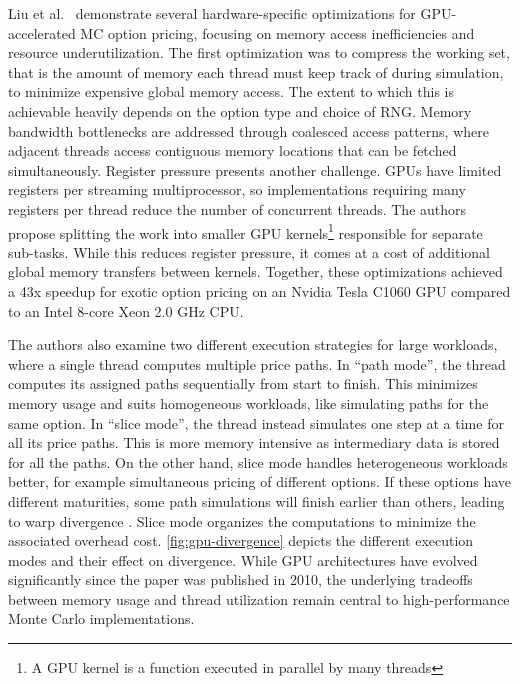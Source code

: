 \documentclass[english,12pt,a4paper,pdftex,sci,utf8]{aaltothesis}
\begin{document}
Liu et al.\ \cite{liu2010efficient} demonstrate several hardware-specific optimizations for GPU-accelerated MC option pricing, focusing on memory access inefficiencies and resource underutilization. The first optimization was to compress the working set, that is the amount of memory each thread must keep track of during simulation, to minimize expensive global memory access. The extent to which this is achievable heavily depends on the option type and choice of RNG. Memory bandwidth bottlenecks are addressed through coalesced access patterns, where adjacent threads access contiguous memory locations that can be fetched simultaneously. Register pressure presents another challenge. GPUs have limited registers per streaming multiprocessor, so implementations requiring many registers per thread reduce the number of concurrent threads. The authors propose splitting the work into smaller GPU kernels\footnote{A GPU kernel is a function executed in parallel by many threads} responsible for separate sub-tasks. While this reduces register pressure, it comes at a cost of additional global memory transfers between kernels. Together, these optimizations achieved a 43x speedup for exotic option pricing on an Nvidia Tesla C1060 GPU compared to an Intel 8-core Xeon 2.0 GHz CPU.

The authors also examine two different execution strategies for large workloads, where a single thread computes multiple price paths. In ``path mode'', the thread computes its assigned paths sequentially from start to finish. This minimizes memory usage and suits homogeneous workloads, like simulating paths for the same option. In ``slice mode'', the thread instead simulates one step at a time for all its price paths. This is more memory intensive as intermediary data is stored for all the paths. On the other hand, slice mode handles heterogeneous workloads better, for example simultaneous pricing of different options. If these options have different maturities, some path simulations will finish earlier than others, leading to warp divergence \cite{liu2010efficient}. Slice mode organizes the computations to minimize the associated overhead cost. \cref{fig:gpu-divergence} depicts the different execution modes and their effect on divergence. While GPU architectures have evolved significantly since the paper was published in 2010, the underlying tradeoffs between memory usage and thread utilization remain central to high-performance Monte Carlo implementations.
\end{document}
